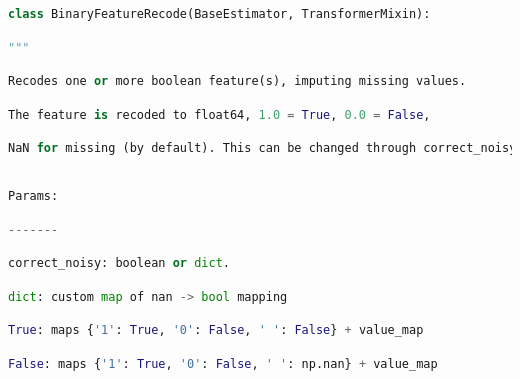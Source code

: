 \documentclass[
  11pt,
  a4paper,
  DIV=12,captions=tableheading,oneside]{scrbook}
\begin{document}
\begin{lstlisting}[language=Python,stepnumber=2,basicstyle=\footnotesize]
\end{lstlisting}
\begin{lstlisting}[language=Python,stepnumber=2,basicstyle=\footnotesize]
class BinaryFeatureRecode(BaseEstimator, TransformerMixin):\end{lstlisting}
\begin{lstlisting}[language=Python,stepnumber=2,basicstyle=\footnotesize]
    """\end{lstlisting}
\begin{lstlisting}[language=Python,stepnumber=2,basicstyle=\footnotesize]
    Recodes one or more boolean feature(s), imputing missing values.\end{lstlisting}
\begin{lstlisting}[language=Python,stepnumber=2,basicstyle=\footnotesize]
    The feature is recoded to float64, 1.0 = True, 0.0 = False,\end{lstlisting}
\begin{lstlisting}[language=Python,stepnumber=2,basicstyle=\footnotesize]
    NaN for missing (by default). This can be changed through correct_noisy\end{lstlisting}
\begin{lstlisting}[language=Python,stepnumber=2,basicstyle=\footnotesize]
\end{lstlisting}
\begin{lstlisting}[language=Python,stepnumber=2,basicstyle=\footnotesize]
    Params:\end{lstlisting}
\begin{lstlisting}[language=Python,stepnumber=2,basicstyle=\footnotesize]
    -------\end{lstlisting}
\begin{lstlisting}[language=Python,stepnumber=2,basicstyle=\footnotesize]
    correct_noisy: boolean or dict.\end{lstlisting}
\begin{lstlisting}[language=Python,stepnumber=2,basicstyle=\footnotesize]
                    dict: custom map of nan -> bool mapping\end{lstlisting}
\begin{lstlisting}[language=Python,stepnumber=2,basicstyle=\footnotesize]
                    True: maps {'1': True, '0': False, ' ': False} + value_map\end{lstlisting}
\begin{lstlisting}[language=Python,stepnumber=2,basicstyle=\footnotesize]
                    False: maps {'1': True, '0': False, ' ': np.nan} + value_map\end{lstlisting}
\end{document}
